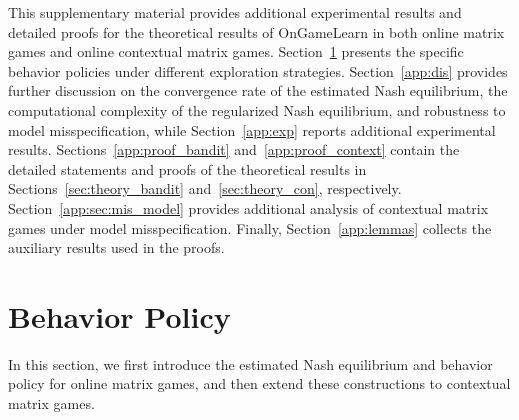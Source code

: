 \documentclass[12pt]{article}
\begin{document}



\newpage

\appendix
\newtheorem{lemma}{Lemma}   
 


This supplementary material provides additional experimental results and detailed proofs for the theoretical results of OnGameLearn in both online matrix games and online contextual matrix games. Section~\ref{app:bandit_alg} presents the specific behavior policies under different exploration strategies. Section~\ref{app:dis} provides further discussion on the convergence rate of the estimated Nash equilibrium, the computational complexity of the regularized Nash equilibrium, and robustness to model misspecification, while Section~\ref{app:exp} reports additional experimental results. Sections~\ref{app:proof_bandit} and~\ref{app:proof_context} contain the detailed statements and proofs of the theoretical results in Sections~\ref{sec:theory_bandit} and~\ref{sec:theory_con}, respectively. Section~\ref{app:sec:mis_model} provides additional analysis of contextual matrix games under model misspecification. Finally, Section~\ref{app:lemmas} collects the auxiliary results used in the proofs.





\section{Behavior Policy}
\label{app:bandit_alg}
In this section, we first introduce the estimated Nash equilibrium and behavior policy for online matrix games, and then extend these constructions to contextual matrix games.
\end{document}
